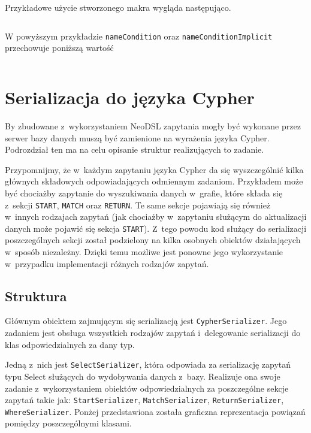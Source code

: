 \documentclass[brudnopis]{xmgr}
\begin{document}
\medskip\noindent Przykładowe użycie stworzonego makra wygląda następująco.

\inputminted{scala}{listings/scala/macro-usage.scala}

W powyższym przykładzie \texttt{nameCondition} oraz  \texttt{nameConditionImplicit} przechowuje poniższą wartość

\inputminted{scala}{listings/scala/macro-usage-result.scala}

\section{Serializacja do języka Cypher}

By zbudowane z~wykorzystaniem NeoDSL zapytania mogły być wykonane przez serwer bazy danych muszą być zamienione na wyrażenia języka Cypher. Podrozdział ten ma na celu opisanie struktur realizujących to zadanie. 

Przypomnijmy, że w~każdym zapytaniu języka Cypher da się wyszczególnić kilka głównych składowych odpowiadających odmiennym zadaniom. Przykładem może być chociażby zapytanie do wyszukiwania danych w~grafie, które składa się z~sekcji \texttt{START}, \texttt{MATCH} oraz \texttt{RETURN}. Te same sekcje pojawiają się również w~innych rodzajach zapytań (jak chociażby w~zapytaniu służącym do aktualizacji danych może pojawić się sekcja \texttt{START}). Z~tego powodu kod służący do serializacji poszczególnych sekcji został podzielony na kilka osobnych obiektów działających w~sposób niezależny. Dzięki temu możliwe jest ponowne jego wykorzystanie w~przypadku implementacji różnych rodzajów zapytań.

\subsection{Struktura}

Głównym obiektem zajmującym się serializacją jest \texttt{CypherSerializer}. Jego zadaniem jest obsługa wszystkich rodzajów zapytań i~delegowanie serializacji do klas odpowiedzialnych za dany typ.

Jedną z~nich jest \texttt{SelectSerializer}, która odpowiada za serializację zapytań typu Select służących do wydobywania danych z~bazy. Realizuje ona swoje zadanie z~wykorzystaniem obiektów odpowiedzialnych za poszczególne sekcje zapytań takie jak: \texttt{StartSerializer}, \texttt{MatchSerializer}, \texttt{ReturnSerializer}, \texttt{WhereSerializer}. Ponżej przedstawiona została graficzna reprezentacja powiązań pomiędzy poszczególnymi klasami.
\end{document}
